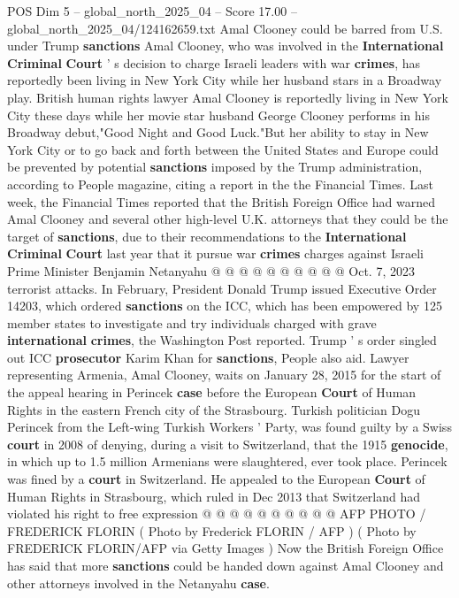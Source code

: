 \begin{textsample}{POS Dim 5 – global\_north\_2025\_04 – Score 17.00 – global\_north\_2025\_04/124162659.txt}  \label{ex:f5_pos_106}
Amal Clooney could be barred from U.S. under Trump \textbf{sanctions} Amal Clooney, who was involved in the \textbf{International} \textbf{Criminal} \textbf{Court} ' s decision to charge Israeli leaders with war \textbf{crimes}, has reportedly been living in New York City while her husband stars in a Broadway play.
British human rights lawyer Amal Clooney is reportedly living in New York City these days while her movie star husband George Clooney performs in his Broadway debut,"Good Night and Good Luck."But her ability to stay in New York City or to go back and forth between the United States and Europe could be prevented by potential \textbf{sanctions} imposed by the Trump administration, according to People magazine, citing a report in the the Financial Times.
Last week, the Financial Times reported that the British Foreign Office had warned Amal Clooney and several other high-level U.K. attorneys that they could be the target of \textbf{sanctions}, due to their recommendations to the \textbf{International} \textbf{Criminal} \textbf{Court} last year that it pursue war \textbf{crimes} charges against Israeli Prime Minister Benjamin Netanyahu @ @ @ @ @ @ @ @ @ @ Oct. 7, 2023 terrorist attacks.
In February, President Donald Trump issued Executive Order 14203, which ordered \textbf{sanctions} on the ICC, which has been empowered by 125 member states to investigate and try individuals charged with grave \textbf{international} \textbf{crimes}, the Washington Post reported.
Trump ' s order singled out ICC \textbf{prosecutor} Karim Khan for \textbf{sanctions}, People also aid.
Lawyer representing Armenia, Amal Clooney, waits on January 28, 2015 for the start of the appeal hearing in Perincek \textbf{case} before the European \textbf{Court} of Human Rights in the eastern French city of the Strasbourg.
Turkish politician Dogu Perincek from the Left-wing Turkish Workers ' Party, was found guilty by a Swiss \textbf{court} in 2008 of denying, during a visit to Switzerland, that the 1915 \textbf{genocide}, in which up to 1.5 million Armenians were slaughtered, ever took place.
Perincek was fined by a \textbf{court} in Switzerland.
He appealed to the European \textbf{Court} of Human Rights in Strasbourg, which ruled in Dec 2013 that Switzerland had violated his right to free expression @ @ @ @ @ @ @ @ @ @ AFP PHOTO / FREDERICK FLORIN ( Photo by Frederick FLORIN / AFP ) ( Photo by FREDERICK FLORIN/AFP via Getty Images ) Now the British Foreign Office has said that more \textbf{sanctions} could be handed down against Amal Clooney and other attorneys involved in the Netanyahu \textbf{case}.

\end{textsample}
